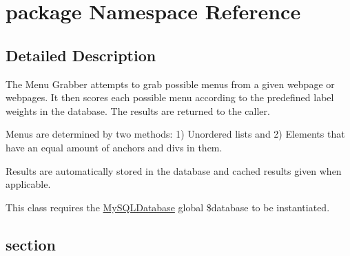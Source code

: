 \hypertarget{namespacepackage}{\section{package Namespace Reference}
\label{namespacepackage}
}


\subsection{Detailed Description}
The Menu Grabber attempts to grab possible menus from a given webpage or webpages. It then scores each possible menu according to the predefined label weights in the database. The results are returned to the caller.

Menus are determined by two methods\-: 1) Unordered lists and 2) Elements that have an equal amount of anchors and divs in them.

Results are automatically stored in the database and cached results given when applicable.

This class requires the \hyperlink{classMySQLDatabase}{My\-S\-Q\-L\-Database} global \$database to be instantiated.\hypertarget{/root/SSDPI/frontend/class.MenuGrabber.php_section}{}\subsection{section}\label{/root/SSDPI/frontend/class.MenuGrabber.php_section}
